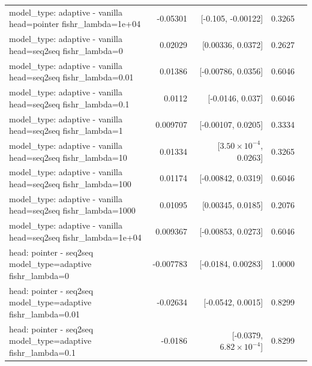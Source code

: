 \documentclass[10pt]{article}
\makeatletter
\newcommand{\stackcell}[1]{\begin{tabular}[t]{@{}l@{}}#1\end{tabular}}
\makeatother
\begin{document}
{\begin{longtable}{lrrrl}
\stackcell{model\_type: adaptive - vanilla\\\footnotesize head=pointer fishr\_lambda=1e+04 } & -0.05301 & [-0.105, -0.00122] & 0.3265 & \\
\stackcell{model\_type: adaptive - vanilla\\\footnotesize head=seq2seq fishr\_lambda=0 } & 0.02029 & [0.00336, 0.0372] & 0.2627 & \\
\stackcell{model\_type: adaptive - vanilla\\\footnotesize head=seq2seq fishr\_lambda=0.01 } & 0.01386 & [-0.00786, 0.0356] & 0.6046 & \\
\stackcell{model\_type: adaptive - vanilla\\\footnotesize head=seq2seq fishr\_lambda=0.1 } & 0.0112 & [-0.0146, 0.037] & 0.6046 & \\
\stackcell{model\_type: adaptive - vanilla\\\footnotesize head=seq2seq fishr\_lambda=1 } & 0.009707 & [-0.00107, 0.0205] & 0.3334 & \\
\stackcell{model\_type: adaptive - vanilla\\\footnotesize head=seq2seq fishr\_lambda=10 } & 0.01334 & [$3.50\times10^{-4}$, 0.0263] & 0.3265 & \\
\stackcell{model\_type: adaptive - vanilla\\\footnotesize head=seq2seq fishr\_lambda=100 } & 0.01174 & [-0.00842, 0.0319] & 0.6046 & \\
\stackcell{model\_type: adaptive - vanilla\\\footnotesize head=seq2seq fishr\_lambda=1000 } & 0.01095 & [0.00345, 0.0185] & 0.2076 & \\
\stackcell{model\_type: adaptive - vanilla\\\footnotesize head=seq2seq fishr\_lambda=1e+04 } & 0.009367 & [-0.00853, 0.0273] & 0.6046 & \\
\stackcell{head: pointer - seq2seq\\\footnotesize model\_type=adaptive fishr\_lambda=0 } & -0.007783 & [-0.0184, 0.00283] & 1.0000 & \\
\stackcell{head: pointer - seq2seq\\\footnotesize model\_type=adaptive fishr\_lambda=0.01 } & -0.02634 & [-0.0542, 0.0015] & 0.8299 & \\
\stackcell{head: pointer - seq2seq\\\footnotesize model\_type=adaptive fishr\_lambda=0.1 } & -0.0186 & [-0.0379, $6.82\times10^{-4}$] & 0.8299 & \\

\end{longtable}}
\end{document}
